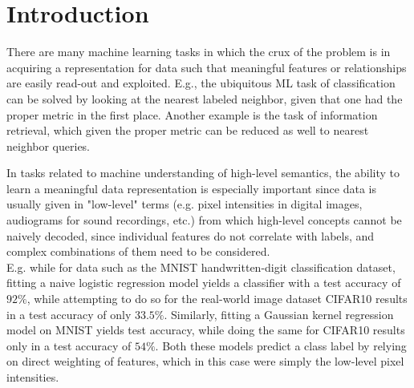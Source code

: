 \chapter{Introduction}
\label{Introduction}
There are many machine learning tasks in which the crux of the problem is in acquiring a representation for data such that meaningful features or relationships are easily read-out and exploited. E.g., the ubiquitous ML task of classification can be solved by looking at the nearest labeled neighbor, given that one had the proper metric in the first place. 
Another example is the task of information retrieval, which given the proper metric can be reduced as well to nearest neighbor queries.

In tasks related to machine understanding of high-level semantics, the ability to learn a meaningful data representation is especially important since data is usually given in "low-level" terms (e.g. pixel intensities in digital images, audiograms for sound recordings, etc.) from which high-level concepts cannot be naively decoded, since individual features do not correlate with labels, and complex combinations of them need to be considered. \\
E.g. while for data such as the MNIST handwritten-digit classification dataset, fitting a naive logistic regression model yields a classifier with a test accuracy of $92\%$, %
while attempting to do so for the real-world image dataset CIFAR10 results in a test accuracy of only $33.5\%$. %
Similarly, fitting a Gaussian kernel regression model on MNIST yields  test accuracy, while doing the same for CIFAR10 results only in a test accuracy of $54\%$. Both these models predict a class label by relying on direct weighting of features, which in this case were simply the low-level pixel intensities. 

